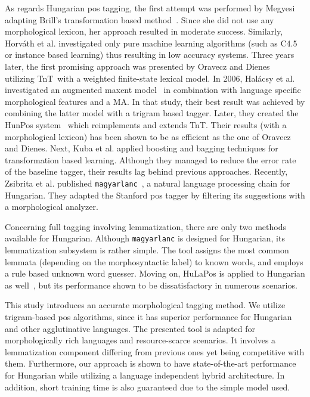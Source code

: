 As regards Hungarian \gls{pos} tagging, the first attempt was performed by Megyesi~\cite{Megyesi1998} adapting Brill’s transformation based method~\cite{Brill1992}.
Since she did not use any morphological lexicon, her approach resulted in moderate success.
Similarly, Horváth et al. investigated \cite{Horvath1999} only pure machine learning algorithms (such as C4.5 or instance based learning) thus resulting in low accuracy systems.
Three years later, the first promising approach was presented by Oravecz and Dienes~\cite{Oravecz2002a} utilizing TnT~\cite{Brants2000}with a weighted finite-state lexical model.
In 2006, Halácsy et al. investigated an augmented \acrshort{maxent} model~\cite{Halacsy2006} in combination with language specific morphological features and a MA.
In that study, their best result was achieved by combining the latter model with a trigram based tagger.
Later, they created the HunPos system~\cite{Halacsy2007} which reimplements and extends TnT.
Their results (with a morphological lexicon) has been shown to be as efficient as the one of Oravecz and Dienes.
Next, Kuba et al. applied boosting and bagging techniques for transformation based learning.
Although they managed to reduce the error rate of the baseline tagger, their results lag behind previous approaches.
Recently, Zsibrita et al. published \texttt{magyarlanc}~\cite{zsibrata2013magyarlanc}, a natural language processing chain for Hungarian.
They adapted the Stanford \gls{pos} tagger by filtering its suggestions with a morphological analyzer. 

Concerning full tagging involving lemmatization, there are only two methods available for Hungarian.
Although \texttt{magyarlanc} is designed for Hungarian, its lemmatization subsystem is rather simple.
The tool assigns the most common lemmata (depending on the morphosyntactic label) to known words, and employs a rule based unknown word guesser.
Moving on, HuLaPos is applied to Hungarian as well~\cite{Laki2013}, but its performance shown to be dissatisfactory in numerous scenarios. 

This study introduces an accurate morphological tagging method.
We utilize trigram-based \gls{pos} algorithms, since it has superior performance for Hungarian and other agglutinative languages.
The presented tool is adapted for morphologically rich languages and resource-scarce scenarios.
It involves a lemmatization component differing from previous ones yet being competitive with them.
Furthermore, our approach is shown to have state-of-the-art performance for Hungarian while utilizing a language independent hybrid architecture.
In addition, short training time is also guaranteed due to the simple model used.



